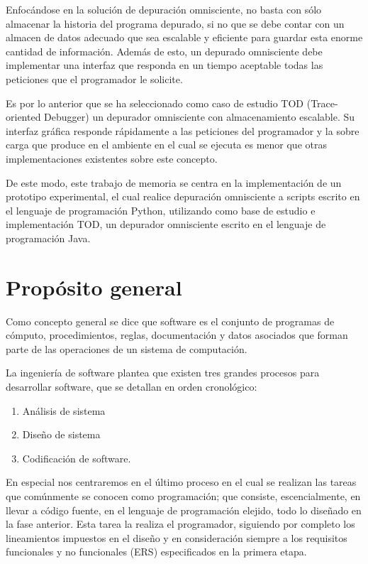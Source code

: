 \documentclass[12pt,legalpaper]{report}
\begin{document}
Enfocándose en la solución de depuración omnisciente, no basta con sólo almacenar la historia del programa depurado, si no que se debe contar con un almacen de datos adecuado que sea escalable y eficiente para guardar esta enorme cantidad de información.  Además de esto, un depurado omnisciente debe implementar una interfaz que responda en un tiempo aceptable todas las peticiones que el programador le solicite.

Es por lo anterior que se ha seleccionado como caso de estudio TOD (Trace-oriented Debugger) \cite{tod} un depurador omnisciente con almacenamiento escalable.  Su interfaz gráfica responde rápidamente a las peticiones del programador y la sobre carga que produce en el ambiente en el cual se ejecuta es menor que otras implementaciones existentes sobre este concepto.

De este modo, este trabajo de memoria se centra en la implementación de un prototipo experimental, el cual realice depuración omnisciente a scripts escrito en el lenguaje de programación Python, utilizando como base de estudio e implementación TOD, un depurador omnisciente escrito en el lenguaje de programación Java.

\chapter{Propósito general}

Como concepto general se dice que software es el conjunto de programas de cómputo, procedimientos, reglas, documentación y datos asociados que forman parte de las operaciones de un sistema de computación. \cite{ieee}

La ingeniería de software plantea que existen tres grandes procesos para desarrollar software, que se detallan en orden cronológico:
\begin{enumerate}
	\item Análisis de sistema
	\item Diseño de sistema
	\item Codificación de software.
\end{enumerate}

En especial nos centraremos en el último proceso en el cual se realizan las tareas que comúnmente se conocen como programación; que consiste, escencialmente, en llevar a código fuente, en el lenguaje de programación elejido, todo lo diseñado en la fase anterior. Esta tarea la realiza el programador, siguiendo por completo los lineamientos impuestos en el diseño y en consideración siempre a los requisitos funcionales y no funcionales (ERS) especificados en la primera etapa.
\end{document}
